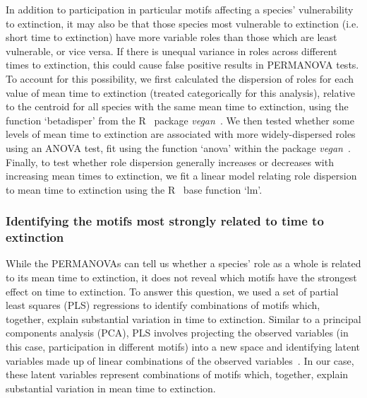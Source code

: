 \documentclass[12pt]{article}
\begin{document}
\begin{spacing}{2.0}
            
            In addition to participation in particular motifs affecting a species' vulnerability to extinction, it may also be that those species most vulnerable to extinction (i.e. short time to extinction) have more variable roles than those which are least vulnerable, or vice versa. 
            If there is unequal variance in roles across different times to extinction, this could cause false positive results in PERMANOVA tests.
            To account for this possibility, we first calculated the dispersion of roles for each value of mean time to extinction (treated categorically for this analysis), relative to the centroid for all species with the same mean time to extinction, using the function `betadisper' from the R~\citep{R} package \emph{vegan}~\citep{vegan}.
            We then tested whether some levels of mean time to extinction are associated with more widely-dispersed roles using an ANOVA test, fit using the function `anova' within the package \emph{vegan}~\citep{vegan}.
            Finally, to test whether role dispersion generally increases or decreases with increasing mean times to extinction, we fit a linear model relating role dispersion to mean time to extinction using the R~\citep{R} base function `lm'.


		\subsubsection*{Identifying the motifs most strongly related to time to extinction}

			While the PERMANOVAs can tell us whether a species' role as a whole is related to its mean time to extinction, it does not reveal which motifs have the strongest effect on time to extinction.
			To answer this question, we used a set of partial least squares (PLS) regressions to identify combinations of motifs which, together, explain substantial variation in time to extinction. 
			Similar to a principal components analysis (PCA), PLS involves projecting the observed variables (in this case, participation in different motifs) into a new space and identifying latent variables made up of linear combinations of the observed variables~\citep{Mevik2004,pls}.
			In our case, these latent variables represent combinations of motifs which, together, explain substantial variation in mean time to extinction.
			

\end{spacing}
\end{document}
